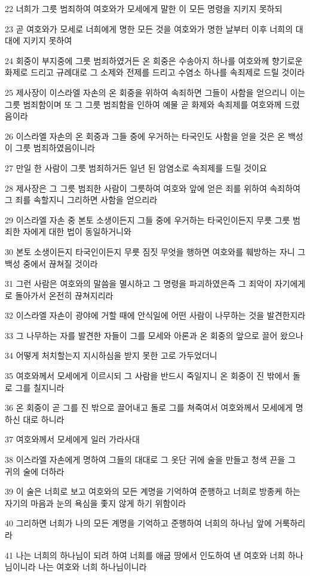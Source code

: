 \par 22 너희가 그릇 범죄하여 여호와가 모세에게 말한 이 모든 명령을 지키지 못하되
\par 23 곧 여호와가 모세로 너희에게 명한 모든 것을 여호와가 명한 날부터 이후 너희의 대대에 지키지 못하여
\par 24 회중이 부지중에 그릇 범죄하였거든 온 회중은 수송아지 하나를 여호와께 향기로운 화제로 드리고 규례대로 그 소제와 전제를 드리고 수염소 하나를 속죄제로 드릴 것이라
\par 25 제사장이 이스라엘 자손의 온 회중을 위하여 속죄하면 그들이 사함을 얻으리니 이는 그릇 범죄함이며 또 그 그릇 범죄함을 인하여 예물 곧 화제와 속죄제를 여호와께 드렸음이라
\par 26 이스라엘 자손의 온 회중과 그들 중에 우거하는 타국인도 사함을 얻을 것은 온 백성이 그릇 범죄하였음이니라
\par 27 만일 한 사람이 그릇 범죄하거든 일년 된 암염소로 속죄제를 드릴 것이요
\par 28 제사장은 그 그릇 범죄한 사람이 그릇하여 여호와 앞에 얻은 죄를 위하여 속죄하여 그 죄를 속할지니 그리하면 사함을 얻으리라
\par 29 이스라엘 자손 중 본토 소생이든지 그들 중에 우거하는 타국인이든지 무릇 그릇 범죄한 자에게 대한 법이 동일하거니와
\par 30 본토 소생이든지 타국인이든지 무릇 짐짓 무엇을 행하면 여호와를 훼방하는 자니 그 백성 중에서 끊쳐질 것이라
\par 31 그런 사람은 여호와의 말씀을 멸시하고 그 명령을 파괴하였은즉 그 죄악이 자기에게로 돌아가서 온전히 끊쳐지리라
\par 32 이스라엘 자손이 광야에 거할 때에 안식일에 어떤 사람이 나무하는 것을 발견한지라
\par 33 그 나무하는 자를 발견한 자들이 그를 모세와 아론과 온 회중의 앞으로 끌어 왔으나
\par 34 어떻게 처치할는지 지시하심을 받지 못한 고로 가두었더니
\par 35 여호와께서 모세에게 이르시되 그 사람을 반드시 죽일지니 온 회중이 진 밖에서 돌로 그를 칠지니라
\par 36 온 회중이 곧 그를 진 밖으로 끌어내고 돌로 그를 쳐죽여서 여호와께서 모세에게 명하신 대로 하니라
\par 37 여호와께서 모세에게 일러 가라사대
\par 38 이스라엘 자손에게 명하여 그들의 대대로 그 옷단 귀에 술을 만들고 청색 끈을 그 귀의 술에 더하라
\par 39 이 술은 너희로 보고 여호와의 모든 계명을 기억하여 준행하고 너희로 방종케 하는 자기의 마음과 눈의 욕심을 좇지 않게 하기 위함이라
\par 40 그리하면 너희가 나의 모든 계명을 기억하고 준행하여 너희의 하나님 앞에 거룩하리라
\par 41 나는 너희의 하나님이 되려 하여 너희를 애굽 땅에서 인도하여 낸 여호와 너희 하나님이니라 나는 여호와 너희 하나님이니라

